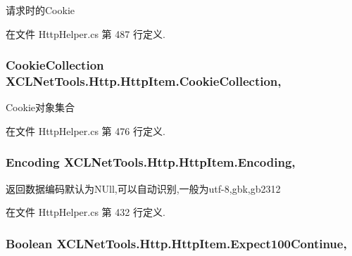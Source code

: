 请求时的\-Cookie 



在文件 Http\-Helper.\-cs 第 487 行定义.

\hypertarget{class_x_c_l_net_tools_1_1_http_1_1_http_item_aa6eccba1583250b9a4ff6b18646bd8a6}{
\subsubsection[{Cookie\-Collection}]{\setlength{\rightskip}{0pt plus 5cm}Cookie\-Collection X\-C\-L\-Net\-Tools.\-Http.\-Http\-Item.\-Cookie\-Collection\hspace{0.3cm}{\ttfamily [get]}, {\ttfamily [set]}}}\label{class_x_c_l_net_tools_1_1_http_1_1_http_item_aa6eccba1583250b9a4ff6b18646bd8a6}


Cookie对象集合 



在文件 Http\-Helper.\-cs 第 476 行定义.

\hypertarget{class_x_c_l_net_tools_1_1_http_1_1_http_item_aa3c95b011d9366a1de9f897603b71b93}{
\subsubsection[{Encoding}]{\setlength{\rightskip}{0pt plus 5cm}Encoding X\-C\-L\-Net\-Tools.\-Http.\-Http\-Item.\-Encoding\hspace{0.3cm}{\ttfamily [get]}, {\ttfamily [set]}}}\label{class_x_c_l_net_tools_1_1_http_1_1_http_item_aa3c95b011d9366a1de9f897603b71b93}


返回数据编码默认为\-N\-Ull,可以自动识别,一般为utf-\/8,gbk,gb2312 



在文件 Http\-Helper.\-cs 第 432 行定义.

\hypertarget{class_x_c_l_net_tools_1_1_http_1_1_http_item_a8e4c64cbf9ef46d8734104478b357322}{
\subsubsection[{Expect100\-Continue}]{\setlength{\rightskip}{0pt plus 5cm}Boolean X\-C\-L\-Net\-Tools.\-Http.\-Http\-Item.\-Expect100\-Continue\hspace{0.3cm}{\ttfamily [get]}, {\ttfamily [set]}}}\label{class_x_c_l_net_tools_1_1_http_1_1_http_item_a8e4c64cbf9ef46d8734104478b357322}



